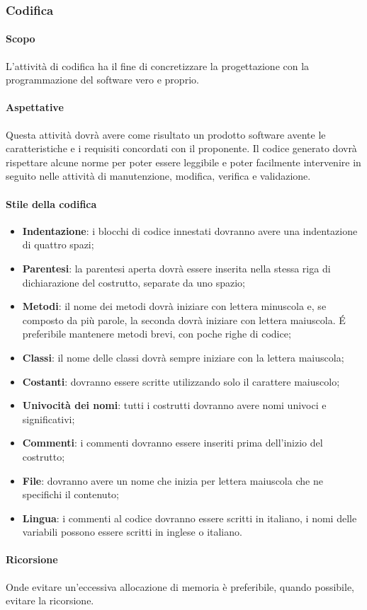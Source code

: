 \subsubsection{Codifica}
\paragraph{Scopo}
L'attività di codifica ha il fine di concretizzare la progettazione con la programmazione del software vero e proprio.
\paragraph{Aspettative}
Questa attività dovrà avere come risultato un prodotto software avente le caratteristiche e i requisiti concordati con il proponente. Il codice generato dovrà rispettare alcune norme per poter essere leggibile e poter facilmente intervenire in seguito nelle attività di manutenzione, modifica, verifica e validazione.
\paragraph{Stile della codifica}
\begin{itemize}
\item \textbf{Indentazione}: i blocchi di codice innestati dovranno avere una indentazione di quattro spazi;
\item \textbf{Parentesi}: la parentesi aperta dovrà essere inserita nella stessa riga di dichiarazione del costrutto, separate da uno spazio; 
\item \textbf{Metodi}: il nome dei metodi dovrà iniziare con lettera minuscola e, se composto da più parole, la seconda dovrà iniziare con lettera maiuscola. \'E preferibile mantenere metodi brevi, con poche righe di codice;
\item \textbf{Classi}: il nome delle classi dovrà sempre iniziare con la lettera maiuscola;
\item \textbf{Costanti}: dovranno essere scritte utilizzando solo il carattere maiuscolo;
\item \textbf{Univocità dei nomi}: tutti i costrutti dovranno avere nomi univoci e significativi;
\item \textbf{Commenti}: i commenti dovranno essere inseriti prima dell'inizio del costrutto;
\item \textbf{File}: dovranno avere un nome che inizia per lettera maiuscola che ne specifichi il contenuto;
\item \textbf{Lingua}: i commenti al codice dovranno essere scritti in italiano, i nomi delle variabili possono essere scritti in inglese o italiano.
\end{itemize}
\paragraph{Ricorsione}
Onde evitare un'eccessiva allocazione di memoria è preferibile, quando possibile, evitare la ricorsione.